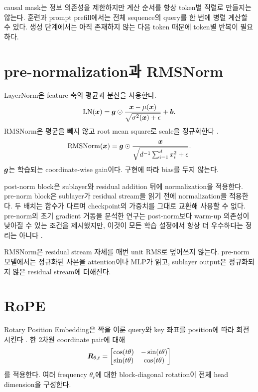 causal mask는 정보 의존성을 제한하지만 계산 순서를 항상 token별 직렬로 만들지는 않는다.
훈련과 prompt prefill에서는 전체 sequence의 query를 한 번에 병렬 계산할 수 있다.
생성 단계에서는 아직 존재하지 않는 다음 token 때문에 token별 반복이 필요하다.

\section{pre-normalization과 RMSNorm}

LayerNorm은 feature 축의 평균과 분산을 사용한다.
\begin{equation}
  \operatorname{LN}(\bm{x})=
  \bm{g}\odot
  \frac{\bm{x}-\mu(\bm{x})}
       {\sqrt{\sigma^2(\bm{x})+\epsilon}}+\bm{b}.
\end{equation}
RMSNorm은 평균을 빼지 않고 root mean square로 scale을 정규화한다 \citep{zhang2019rmsnorm}.
\begin{equation}
  \operatorname{RMSNorm}(\bm{x})=
  \bm{g}\odot
  \frac{\bm{x}}
       {\sqrt{d^{-1}\sum_{i=1}^{d}x_i^2+\epsilon}}.
  \label{eq:rmsnorm}
\end{equation}
$\bm{g}$는 학습되는 coordinate-wise gain이다.
구현에 따라 bias를 두지 않는다.

post-norm block은 sublayer와 residual addition 뒤에 normalization을 적용한다.
pre-norm block은 sublayer가 residual stream을 읽기 전에 normalization을 적용한다.
두 배치는 함수가 다르며 checkpoint의 가중치를 그대로 교환해 사용할 수 없다.
pre-norm의 초기 gradient 거동을 분석한 연구는 post-norm보다 warm-up 의존성이 낮아질 수 있는 조건을 제시했지만, 이것이 모든 학습 설정에서 항상 더 우수하다는 정리는 아니다 \citep{xiong2020layernorm}.

\begin{factbox}
RMSNorm은 residual stream 자체를 매번 unit RMS로 덮어쓰지 않는다.
pre-norm 모델에서는 정규화된 사본을 attention이나 MLP가 읽고, sublayer output은 정규화되지 않은 residual stream에 더해진다.
\end{factbox}

\section{RoPE}

Rotary Position Embedding은 짝을 이룬 query와 key 좌표를 position에 따라 회전시킨다 \citep{su2021roformer}.
한 2차원 coordinate pair에 대해
\begin{equation}
  \bm{R}_{\theta,t}=
  \begin{bmatrix}
    \cos(t\theta)&-\sin(t\theta)\\
    \sin(t\theta)& \cos(t\theta)
  \end{bmatrix}
\end{equation}
를 적용한다.
여러 frequency $\theta_r$에 대한 block-diagonal rotation이 전체 head dimension을 구성한다.

